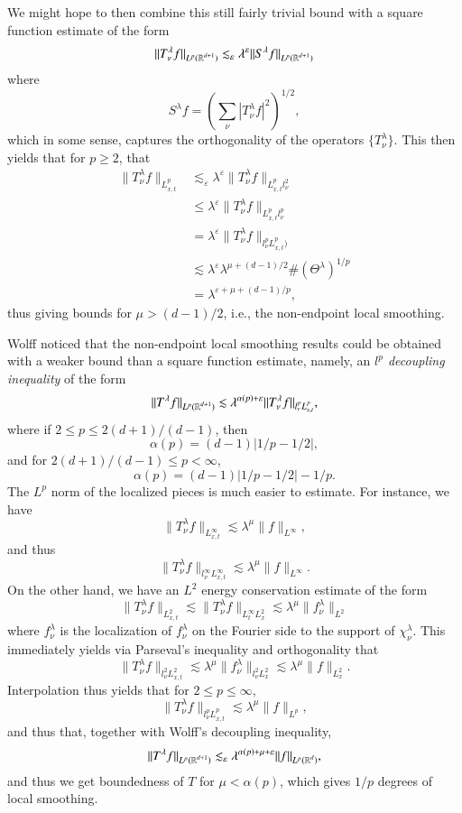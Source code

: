 We might hope to then combine this still fairly trivial bound with a square function estimate of the form
%
\[ \| T^\lambda_\nu f \|_{L^p(\operatorname{\mathbb{R}}^{d+1})} \lesssim_\varepsilon \lambda^\varepsilon \| S^\lambda f \|_{L^p(\operatorname{\mathbb{R}}^{d+1})} \]
%
where
%
\[ S^\lambda f = \left( \sum_\nu | T^\lambda_\nu f |^2 \right)^{1/2}, \]
%
which in some sense, captures the orthogonality of the operators $\{ T^\lambda_\nu \}$. This then yields that for $p \geq 2$, that
%
\begin{align*}
    \| T^\lambda_\nu f \|_{L^p_{x,t}} &\lesssim_\varepsilon \lambda^\varepsilon \| T^\lambda_\nu f \|_{L^p_{x,t} l^2_\nu}\\
    &\leq \lambda^\varepsilon \| T^\lambda_\nu f \|_{L^p_{x,t} l^p_\nu}\\
    &= \lambda^\varepsilon \| T^\lambda_\nu f \|_{l^p_\nu L^p_{x,t})}\\
    &\lesssim \lambda^\varepsilon \lambda^{\mu + (d-1)/2} \#(\Theta^\lambda)^{1/p}\\
    &= \lambda^{\varepsilon + \mu + (d-1) / p},
\end{align*}
%
thus giving bounds for $\mu > (d-1)/2$, i.e., the non-endpoint local smoothing.

Wolff noticed that the non-endpoint local smoothing results could be obtained with a weaker bound than a square function estimate, namely, an \emph{$l^p$ decoupling inequality} of the form
%
\[ \| T^\lambda f \|_{L^p(\operatorname{\mathbb{R}}^{d+1})} \lesssim \lambda^{\alpha(p) + \varepsilon} \| T^\lambda_\nu f \|_{l^p_\nu L^p_{x,t}}, \]
%
where if $2 \leq p \leq 2(d+1)/(d-1)$, then
%
\[ \alpha(p) = (d-1)|1/p - 1/2|, \] 
%
and for $2(d+1)/(d-1) \leq p < \infty$,
%
\[ \alpha(p) = (d-1)|1/p - 1/2| - 1/p. \]
%
The $L^p$ norm of the localized pieces is much easier to estimate. For instance, we have
%
\[ \| T^\lambda_\nu f \|_{L^\infty_{x,t}} \lesssim \lambda^\mu \| f \|_{L^\infty}, \]
%
and thus
%
\[ \| T^\lambda_\nu f \|_{l^\infty_\nu L^\infty_{x,t}} \lesssim \lambda^\mu \| f \|_{L^\infty}. \]
%
On the other hand, we have an $L^2$ energy conservation estimate of the form
%
\[ \| T^\lambda_\nu f \|_{L^2_{x,t}} \lesssim \| T^\lambda_\nu f \|_{L^\infty_t L^2_x} \lesssim \lambda^\mu \| f^\lambda_\nu \|_{L^2} \]
%
where $f^\lambda_\nu$ is the localization of $f^\lambda_\nu$ on the Fourier side to the support of $\chi^\lambda_\nu$. This immediately yields via Parseval's inequality and orthogonality that
%
\[ \| T^\lambda_\nu f \|_{l^2_\nu L^2_{x,t}} \lesssim \lambda^\mu \| f^\lambda_\nu \|_{l^2_\nu L^2_x} \lesssim \lambda^\mu \| f \|_{L^2_x}. \]
%
Interpolation thus yields that for $2 \leq p \leq \infty$,
%
\[ \| T^\lambda_\nu f \|_{l^p_\nu L^p_{x,t}} \lesssim \lambda^\mu \| f \|_{L^p}, \]
%
and thus that, together with Wolff's decoupling inequality,
%
\[ \| T^\lambda f \|_{L^p(\operatorname{\mathbb{R}}^{d+1})} \lesssim_\varepsilon \lambda^{\alpha(p) + \mu + \varepsilon} \| f \|_{L^p(\operatorname{\mathbb{R}}^d)}, \]
%
and thus we get boundedness of $T$ for $\mu < \alpha(p)$, which gives $1/p$ degrees of local smoothing.








